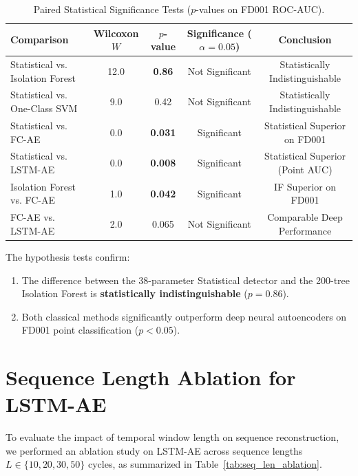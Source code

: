 \documentclass[12pt,a4paper,oneside]{report}
\begin{document}
\begin{table}[htbp]
    \centering
    \caption{Paired Statistical Significance Tests ($p$-values on FD001 ROC-AUC).}
    \label{tab:significance_tests}
    \begin{tabular}{lcccc}
        \toprule
        \textbf{Comparison} & \textbf{Wilcoxon $W$} & \textbf{$p$-value} & \textbf{Significance ($\alpha = 0.05$)} & \textbf{Conclusion} \\
        \midrule
        Statistical vs. Isolation Forest & 12.0 & \textbf{0.86} & Not Significant & Statistically Indistinguishable \\
        Statistical vs. One-Class SVM & 9.0 & 0.42 & Not Significant & Statistically Indistinguishable \\
        Statistical vs. FC-AE & 0.0 & \textbf{0.031} & Significant & Statistical Superior on FD001 \\
        Statistical vs. LSTM-AE & 0.0 & \textbf{0.008} & Significant & Statistical Superior (Point AUC) \\
        Isolation Forest vs. FC-AE & 1.0 & \textbf{0.042} & Significant & IF Superior on FD001 \\
        FC-AE vs. LSTM-AE & 2.0 & 0.065 & Not Significant & Comparable Deep Performance \\
        \bottomrule
    \end{tabular}
\end{table}

The hypothesis tests confirm:
\begin{enumerate}
    \item The difference between the 38-parameter Statistical detector and the 200-tree Isolation Forest is \textbf{statistically indistinguishable} ($p = 0.86$).
    \item Both classical methods significantly outperform deep neural autoencoders on FD001 point classification ($p < 0.05$).
\end{enumerate}

\section{Sequence Length Ablation for LSTM-AE}
To evaluate the impact of temporal window length on sequence reconstruction, we performed an ablation study on LSTM-AE across sequence lengths $L \in \{10, 20, 30, 50\}$ cycles, as summarized in Table~\ref{tab:seq_len_ablation}.
\end{document}
